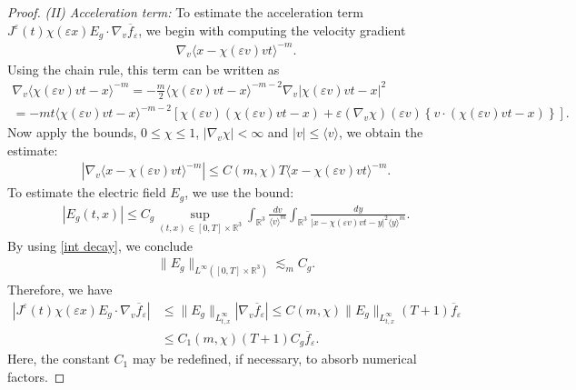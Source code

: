 \documentclass[10pt,a4paper]{amsart}
\begin{document}
\begin{proof}
\noindent \textit{(II) Acceleration term:} To estimate the acceleration term $J^\varepsilon(t)\chi(\varepsilon x)E_g\cdot\nabla_v\overline{f}_\varepsilon$, we begin with computing the velocity gradient 
\begin{align*}
\nabla_v\langle x-\chi(\varepsilon v)vt\rangle^{-m}.
\end{align*}Using the chain rule, this term can be written as
\begin{multline*}
\nabla_v\langle \chi(\varepsilon v)vt - x\rangle^{-m} = -\frac{m}{2} \langle \chi(\varepsilon v)vt - x\rangle^{-m-2} \nabla_v|\chi(\varepsilon v)vt - x|^2\\
= -m t\langle \chi(\varepsilon v)vt - x\rangle^{-m-2}\left[\chi(\varepsilon v)(\chi(\varepsilon v)vt - x) + \varepsilon(\nabla_v\chi)(\varepsilon v)\left\{v\cdot(\chi(\varepsilon v)vt - x)\right\}\right].
\end{multline*}Now apply the bounds, $0\le \chi\le1$, $|\nabla_v\chi|<\infty$ and $|v|\le\langle v\rangle$, we obtain the estimate:
\begin{align}\label{v grad}
|\nabla_v\langle x-\chi(\varepsilon v)vt\rangle^{-m}| \le C(m,\chi)T\langle x-\chi(\varepsilon v)vt\rangle^{-m}.
\end{align}
To estimate the electric field $E_g$, we use the bound:
\begin{align*}
|E_g(t,x)| \le C_g\sup_{(t,x)\in[0,T]\times\mathbb{R}^3} \int_{\mathbb{R}^3} \frac{dv}{\langle v\rangle^m} \int_{\mathbb{R}^3} \frac{dy}{|x-\chi(\varepsilon v)vt-y|^2\langle y \rangle^m}.
\end{align*}By using \eqref{int decay}, we conclude 
\begin{align}\label{E bound}
\lVert E_g\rVert_{L^\infty([0,T]\times\mathbb{R}^3)} \lesssim_m C_g.
\end{align}
Therefore, we have
\begin{align}
|J^\varepsilon(t)\chi(\varepsilon x)E_g \cdot\nabla_v\overline{f}_\varepsilon| &\le \lVert E_g\rVert_{L^\infty_{t,x}} |\nabla_v\overline{f}_\varepsilon| \le C(m,\chi)\lVert E_g\rVert_{L^\infty_{t,x}} (T+1)\overline{f}_\varepsilon\nonumber\\
&\le C_1(m,\chi)(T+1)C_g\overline{f}_\varepsilon.\label{Acc est}
\end{align}Here, the constant $C_1$ may be redefined, if necessary, to absorb numerical factors.


\end{proof}
\end{document}
